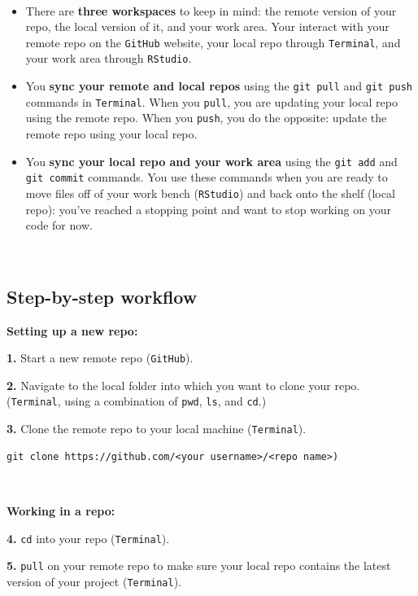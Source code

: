 \documentclass[
]{book}
\begin{document}
~

\begin{itemize}
\item
  There are \textbf{three workspaces} to keep in mind: the remote version of your repo, the local version of it, and your work area. Your interact with your remote repo on the \texttt{GitHub} website, your local repo through \texttt{Terminal}, and your work area through \texttt{RStudio}.
\item
  You \textbf{sync your remote and local repos} using the \texttt{git\ pull} and \texttt{git\ push} commands in \texttt{Terminal}. When you \texttt{pull}, you are updating your local repo using the remote repo. When you \texttt{push}, you do the opposite: update the remote repo using your local repo.
\item
  You \textbf{sync your local repo and your work area} using the \texttt{git\ add} and \texttt{git\ commit} commands. You use these commands when you are ready to move files off of your work bench (\texttt{RStudio}) and back onto the shelf (local repo): you've reached a stopping point and want to stop working on your code for now.
\end{itemize}

~

\hypertarget{step-by-step-workflow}{%
\subsection*{Step-by-step workflow}\label{step-by-step-workflow}}

\textbf{Setting up a new repo:}

\textbf{1.} Start a new remote repo (\texttt{GitHub}).

\textbf{2.} Navigate to the local folder into which you want to clone your repo. (\texttt{Terminal}, using a combination of \texttt{pwd}, \texttt{ls}, and \texttt{cd}.)

\textbf{3.} Clone the remote repo to your local machine (\texttt{Terminal}).

\begin{verbatim}
git clone https://github.com/<your username>/<repo name>)  
\end{verbatim}

~

\textbf{Working in a repo:}

\textbf{4.} \texttt{cd} into your repo (\texttt{Terminal}).

\textbf{5.} \texttt{pull} on your remote repo to make sure your local repo contains the latest version of your project (\texttt{Terminal}).
\end{document}
